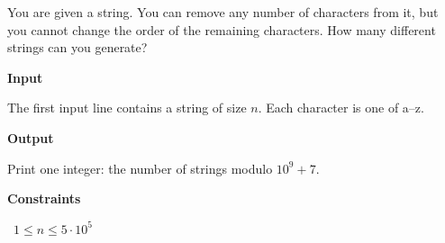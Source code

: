 You are given a string. You can remove any number of characters from it, but you cannot change the order of the remaining characters.
How many different strings can you generate?

\vspace{0.3cm}\noindent\textbf{Input}

The first input line contains a string of size $n$. Each character is one of a–z.

\vspace{0.3cm}\noindent\textbf{Output}

Print one integer: the number of strings modulo $10^9+7$.

\vspace{0.3cm}\noindent\textbf{Constraints}

\textbullet\ $1 \le n \le 5 \cdot 10^5$